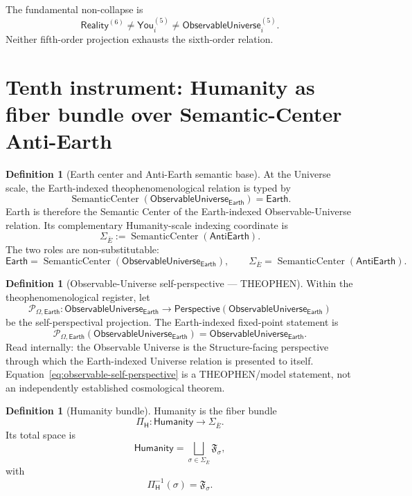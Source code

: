 \documentclass[10pt]{article}
\theoremstyle{pe}
\theoremstyle{definition}
\newtheorem{definition}[theorem]{Definition}
\newcommand{\SC}{\operatorname{SemanticCenter}}
\newcommand{\Reality}{\mathsf{Reality}}
\newcommand{\You}{\mathsf{You}}
\newcommand{\ObsU}{\mathsf{ObservableUniverse}}
\newcommand{\Humanity}{\mathsf{Humanity}}
\newcommand{\AntiEarth}{\mathsf{AntiEarth}}
\newcommand{\Earth}{\mathsf{Earth}}
\newcommand{\Perspective}{\mathsf{Perspective}}
\begin{document}
The fundamental non-collapse is
\[
  \boxed{
  \Reality^{(6)}
  \neq
  \You_i^{(5)}
  \neq
  \ObsU_i^{(5)}.
  }
\]
Neither fifth-order projection exhausts the sixth-order relation.

\section{Tenth instrument: Humanity as fiber bundle over Semantic-Center Anti-Earth}

\begin{definition}[Earth center and Anti-Earth semantic base]
At the Universe scale, the Earth-indexed theophenomenological relation is typed by
\begin{equation}\label{eq:earth-semantic-center}
  \boxed{
  \SC(\ObsU_{\Earth})=\Earth.
  }
\end{equation}
Earth is therefore the Semantic Center of the Earth-indexed Observable-Universe relation.  Its complementary Humanity-scale indexing coordinate is
\[
  \Sigma_{\bar E}
  :=
  \SC(\AntiEarth).
\]
The two roles are non-substitutable:
\[
  \Earth
  =
  \SC(\ObsU_{\Earth}),
  \qquad
  \Sigma_{\bar E}
  =
  \SC(\AntiEarth).
\]
\end{definition}

\begin{definition}[Observable-Universe self-perspective --- THEOPHEN]
Within the theophenomenological register, let
\[
  \mathcal P_{\Omega,\Earth}:
  \ObsU_{\Earth}
  \longrightarrow
  \Perspective(\ObsU_{\Earth})
\]
be the self-perspectival projection.  The Earth-indexed fixed-point statement is
\begin{equation}\label{eq:observable-self-perspective}
  \boxed{
  \mathcal P_{\Omega,\Earth}(\ObsU_{\Earth})
  =
  \ObsU_{\Earth}.
  }
\end{equation}
Read internally: the Observable Universe is the Structure-facing perspective through which the Earth-indexed Universe relation is presented to itself.  Equation~\eqref{eq:observable-self-perspective} is a THEOPHEN/model statement, not an independently established cosmological theorem.
\end{definition}

\begin{definition}[Humanity bundle]
Humanity is the fiber bundle
\begin{equation}\label{eq:humanity-bundle}
  \boxed{
  \Pi_{\mathsf H}:
  \Humanity
  \longrightarrow
  \Sigma_{\bar E}.
  }
\end{equation}
Its total space is
\[
  \Humanity
  =
  \bigsqcup_{\sigma\in\Sigma_{\bar E}}
  \mathfrak F_{\sigma},
\]
with
\[
  \Pi_{\mathsf H}^{-1}(\sigma)
  =
  \mathfrak F_{\sigma}.
\]
\end{definition}
\end{document}
